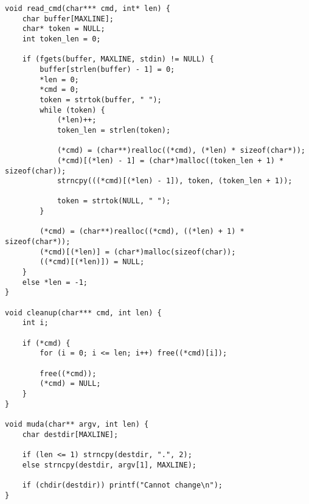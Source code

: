 \newpage
\begin{espacosimples}
\begin{verbatim}
void read_cmd(char*** cmd, int* len) {
    char buffer[MAXLINE];
    char* token = NULL;
    int token_len = 0;
    
    if (fgets(buffer, MAXLINE, stdin) != NULL) {
        buffer[strlen(buffer) - 1] = 0;
        *len = 0;
        *cmd = 0;
        token = strtok(buffer, " ");
        while (token) {
            (*len)++;
            token_len = strlen(token);
            
            (*cmd) = (char**)realloc((*cmd), (*len) * sizeof(char*));
            (*cmd)[(*len) - 1] = (char*)malloc((token_len + 1) * sizeof(char));
            strncpy(((*cmd)[(*len) - 1]), token, (token_len + 1));
            
            token = strtok(NULL, " ");
        }
        
        (*cmd) = (char**)realloc((*cmd), ((*len) + 1) * sizeof(char*));
        (*cmd)[(*len)] = (char*)malloc(sizeof(char));
        ((*cmd)[(*len)]) = NULL;
    }
    else *len = -1;
}

void cleanup(char*** cmd, int len) {
    int i;
    
    if (*cmd) {
        for (i = 0; i <= len; i++) free((*cmd)[i]);
        
        free((*cmd));
        (*cmd) = NULL;
    }
}

void muda(char** argv, int len) {
    char destdir[MAXLINE];
    
    if (len <= 1) strncpy(destdir, ".", 2);
    else strncpy(destdir, argv[1], MAXLINE);
    
    if (chdir(destdir)) printf("Cannot change\n");
}
\end{verbatim}
\end{espacosimples}

